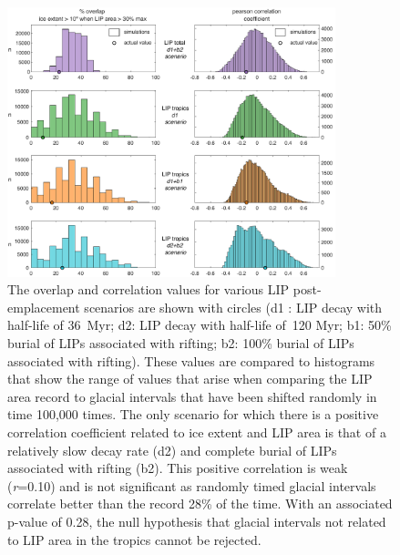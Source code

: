 \documentclass[11pt,letterpaper]{article}
\begin{document}
\begin{figure}[h!]
\begin{center}
	\includegraphics[width=0.85\textwidth]{Manuscript/Figures/overlap_correlation_cropped.pdf}
	\caption{The overlap and correlation values for various LIP post-emplacement scenarios are shown with circles (d1 : LIP decay with half-life of 36~Myr; d2: LIP decay with half-life of~120 Myr; b1: 50\% burial of LIPs associated with rifting; b2: 100\% burial of LIPs associated with rifting). These values are compared to histograms that show the range of values that arise when comparing the LIP area record to glacial intervals that have been shifted randomly in time 100,000 times. The only scenario for which there is a positive correlation coefficient related to ice extent and LIP area is that of a relatively slow decay rate (d2) and complete burial of LIPs associated with rifting (b2). This positive correlation is weak (\textit{r}=0.10) and is not significant as randomly timed glacial intervals correlate better than the record 28\% of the time. With an associated p-value of 0.28, the null hypothesis that glacial intervals not related to LIP area in the tropics cannot be rejected.}
	\label{fig:LIP_correlation}
\end{center}
\end{figure}

\clearpage
\newpage
\footnotesize

\singlespacing



\end{document}
